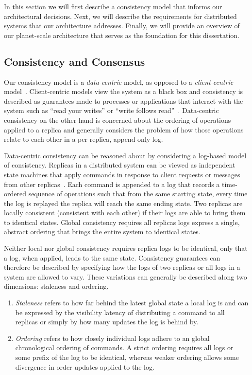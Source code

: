 In this section we will first describe a consistency model that informs our architectural decisions.
Next, we will describe the requirements for distributed systems that our architecture addresses.
Finally, we will provide an overview of our planet-scale architecture that serves as the foundation for this dissertation.

\subsection{Consistency and Consensus}

Our consistency model is a \textit{data-centric} model, as opposed to a \textit{client-centric} model~\cite{bermbach_consistency_2013}.
Client-centric models view the system as a black box and consistency is described as guarantees made to processes or applications that interact with the system such as ``read your writes'' or ``write follows read''~\cite{eventual_consistency}.
Data-centric consistency on the other hand is concerned about the ordering of operations applied to a replica and generally considers the problem of how those operations relate to each other in a per-replica, append-only log.

Data-centric consistency can be reasoned about by considering a log-based model of consistency.
Replicas in a distributed system can be viewed as independent state machines that apply commands in response to client requests or messages from other replicas~\cite{state_machine_approach}.
Each command is appended to a log that records a time-ordered sequence of operations such that from the same starting state, every time the log is replayed the replica will reach the same ending state.
Two replicas are locally consistent (consistent with each other) if their logs are able to bring them to identical states.
Global consistency requires all replicas logs express a single, abstract ordering that brings the entire system to identical states.

Neither local nor global consistency requires replica logs to be identical, only that a log, when applied, leads to the same state.
Consistency guarantees can therefore be described by specifying how the logs of two replicas or all logs in a system are allowed to vary.
These variations can generally be described along two dimensions: staleness and ordering.

\begin{enumerate}
    \item \emph{Staleness} refers to how far behind the latest global state a local log is and can be expressed by the visibility latency of distributing a command to all replicas or simply by how many updates the log is behind by.
    \item \emph{Ordering} refers to how closely individual logs adhere to an global chronological ordering of commands. A strict ordering requires all logs or some prefix of the log to be identical, whereas weaker ordering allows some divergence in order updates applied to the log.
\end{enumerate}

